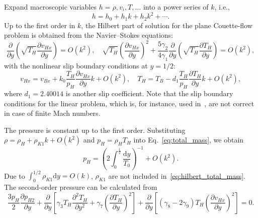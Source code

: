 \documentclass[review]{elsarticle}
\newcommand{\dd}{\mathrm{d}}
\newcommand{\pder}[2][]{\frac{\partial#1}{\partial#2}}
\newcommand{\pderdual}[2][]{\frac{\partial^2#1}{\partial#2^2}}
\newcommand{\OO}[1]{O(#1)}
\begin{document}
Expand macroscopic variables \(h = \rho, v_i, T, \dots\) into a power series of \(k\), i.e.,
\begin{equation}\label{eq:solution_expansion}
    h = h_0 + h_1k + h_2k^2 + \cdots.
\end{equation}
Up to the first order in \(k\), the Hilbert part of solution for the plane Couette-flow problem
is obtained from the Navier--Stokes equations:
\begin{equation}\label{eq:Hilbert_part}
    \pder{y}\left(\sqrt{T_H}\pder[v_{Hx}]{y}\right) = \OO{k^2}, \quad
    \sqrt{T_H}\left(\pder[v_{Hx}]{y}\right)^2 + \frac{5\gamma_2}{4\gamma_1}\pder{y}\left(\sqrt{T_H}\pder[T_H]{y}\right) = \OO{k^2},
\end{equation}
with the nonlinear slip boundary conditions at \(y=1/2\):
\begin{equation}\label{eq:Hilbert_BC}
    v_{Hx} = v_{Bx} + k_0\frac{T_H}{p_H}\pder[v_{Hx}]{y}k + \OO{k^2}, \quad T_H = T_B - d_1\frac{T_H}{p_H}\pder[T_H]{y}k + \OO{k^2},
\end{equation}
where \(d_1 = 2.40014\) is another slip coefficient.
Note that the slip boundary conditions for the linear problem, which is, for instance,
used in~\citet{Sharipov2000}, are not correct in case of finite Mach numbers.

The pressure is constant up to the first order.
Substituting \(\rho = \rho_H + \rho_{K1}k + \OO{k^2}\) and \(p_H = \rho_H T_H\)
into Eq.~\eqref{eq:total_mass}, we obtain
\begin{equation}\label{eq:hilbert_total_mass}
    p_H = \left(2\int_0^\frac12\frac{\dd y}{T_0}\right)^{-1} + \OO{k^2}.
\end{equation}
Due to \(\int_{0}^{1/2}\rho_{K1}\dd{y} = \OO{k}\), \(\rho_{K1}\) are not included in~\eqref{eq:hilbert_total_mass}.
The second-order pressure can be calculated from
\begin{equation}\label{eq:hilbert_p2}
    \frac{3p_H}{2}\pder[p_{H2}]{y}
        + \pder{y}\left[ \gamma_3 T_H \pderdual[T_H]{y} + \gamma_7\left(\pder[T_H]{y}\right)^2 \right]
        + \pder{y}\left[ (\gamma_8-2\gamma_9)T_H\left(\pder[v_{Hx}]{y}\right)^2 \right] = 0.
\end{equation}
\end{document}
